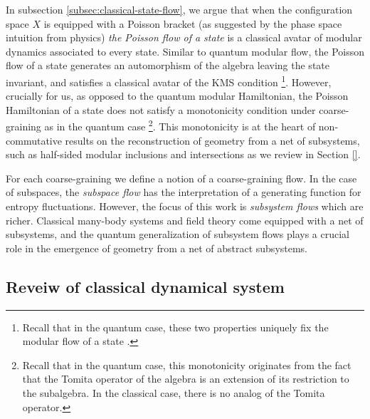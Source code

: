 \documentclass[a4paper,11pt]{article}
\theoremstyle{definition}
\begin{document}
In subsection \ref{subsec:classical-state-flow}, we argue that when the configuration space $X$ is equipped with a Poisson bracket (as suggested by the phase space intuition from physics) {\it the Poisson flow of a state} is a classical avatar of modular dynamics associated to every state. Similar to quantum modular flow, the Poisson flow of a state generates an automorphism of the algebra leaving the state invariant, and satisfies a classical avatar of the KMS condition \footnote{Recall that in the quantum case, these two properties uniquely fix the modular flow of a state \cite{}.}. However, crucially for us, as opposed to the quantum modular Hamiltonian, the Poisson Hamiltonian of a state does not satisfy a monotonicity condition under coarse-graining as in the quantum case \footnote{Recall that in the quantum case, this monotonicity originates from the fact that the Tomita operator of the algebra is an extension of its restriction to the subalgebra. In the classical case, there is no analog of the Tomita operator.}. This monotonicity is at the heart of non-commutative results on the reconstruction of geometry from a net of subsystems, such as half-sided modular inclusions and intersections as we review in Section \ref{}. 

For each coarse-graining we define a notion of a coarse-graining flow. In the case of subspaces, the {\it subspace flow} has the interpretation of a generating function for entropy fluctuations. However, the focus of this work is {\it subsystem flows} which are richer.
Classical many-body systems and field theory come equipped with a net of subsystems, and the quantum generalization of subsystem flows plays a crucial role in the emergence of geometry from a net of abstract subsystems. 

\subsection{Reveiw of classical dynamical system}\label{subsec:classical-definitions}
\end{document}
